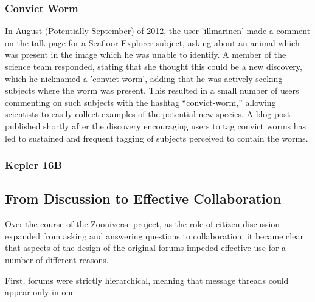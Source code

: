 \documentclass{sigchi}
\begin{document}


\subsubsection{Convict Worm}
In August (Potentially September) of 2012, the user 'illmarinen' made a comment on the talk page for a Seafloor Explorer subject, asking about an animal which was present in the image which he was unable to identify. A member of the science team responded, stating that she thought this could be a new discovery, which he nicknamed a 'convict worm', adding that he was actively seeking subjects where the worm was present. This resulted in a small number of users commenting on such subjects with the hashtag “convict-worm,” allowing scientists to easily collect examples of the potential new species. A blog post published shortly after the discovery encouraging users to tag convict worms has led to sustained and frequent tagging of subjects perceived to contain the worms.

\subsubsection{Kepler 16B}

\subsection{From Discussion to Effective Collaboration}

Over the course of the Zooniverse project, as the role of citizen discussion expanded from asking and answering questions to collaboration, it became clear that aspects of the design of the original forums impeded effective use for a number of different reasons.   

First, forums were strictly hierarchical, meaning that message threads could appear only in one 
\end{document}
